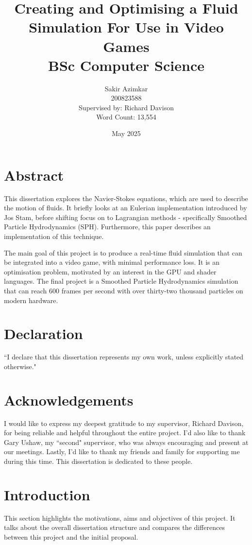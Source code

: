 \documentclass[a4paper, 12pt]{article}
\title
{
    {\Huge Creating and Optimising a Fluid Simulation For Use in Video Games} \\
    \vspace*{1cm}
    {\LARGE BSc Computer Science}
}
\author
{
    \vspace*{0.1cm}\huge Sakir Azimkar \\
    \vspace*{1cm}\huge 200823588 \\
    \large Supervised by: Richard Davison \\
    \large Word Count: 13,554
}
\date{May 2025}
\begin{document}
    \maketitle
    \thispagestyle{empty}

    \newpage

    \section*{Abstract}
    This dissertation explores the Navier-Stokes equations, which are used to describe the motion of fluids. It briefly looks at an Eulerian implementation introduced by Jos Stam\cite{stam}, before shifting focus on to Lagrangian methods - specifically Smoothed Particle Hydrodynamics (SPH). Furthermore, this paper describes an implementation of this technique. 
    
    The main goal of this project is to produce a real-time fluid simulation that can be integrated into a video game, with minimal performance loss. It is an optimisation problem, motivated by an interest in the GPU and shader languages. The final project is a Smoothed Particle Hydrodynamics simulation that can reach 600 frames per second with over thirty-two thousand particles on modern hardware.
    
    \newpage

    \section*{Declaration} ``I declare that this dissertation represents my own work, unless explicitly stated otherwise."

    \newpage

    \section*{Acknowledgements}
    I would like to express my deepest gratitude to my supervisor, Richard Davison, for being reliable and helpful throughout the entire project. I'd also like to thank Gary Ushaw, my ``second" supervisor, who was always encouraging and present at our meetings. Lastly, I'd like to thank my friends and family for supporting me during this time. This dissertation is dedicated to these people.
    
    \newpage
    \tableofcontents
    \newpage
    \listoffigures
    \newpage

    \section{Introduction}
    \label{sec:introduction}
    This section highlights the motivations, aims and objectives of this project. It talks about the overall dissertation structure and compares the differences between this project and the initial proposal.
    
\end{document}
